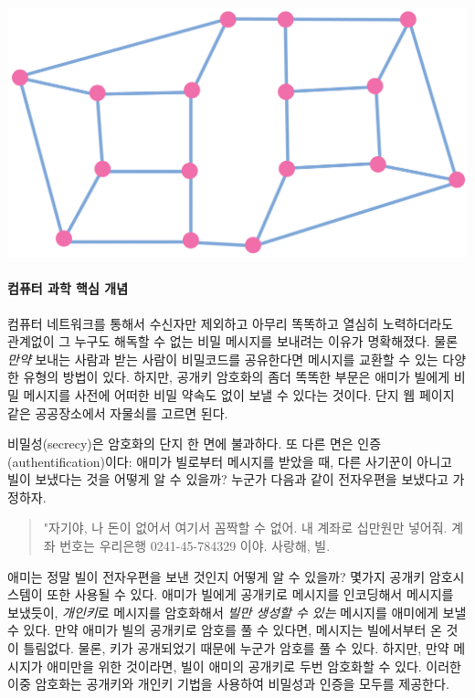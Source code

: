 \documentclass[]{article}
\begin{document}
\includegraphics{csunplugged/05-part/img/ch19-public-key/18-public-key-05-encoding.png}

\mbox{}\paragraph{컴퓨터 과학 핵심 개념}\label{section-253}

컴퓨터 네트워크를 통해서 수신자만 제외하고 아무리 똑똑하고 열심히
노력하더라도 관계없이 그 누구도 해독할 수 없는 비밀 메시지를 보내려는
이유가 명확해졌다. 물론 \emph{만약} 보내는 사람과 받는 사람이 비밀코드를
공유한다면 메시지를 교환할 수 있는 다양한 유형의 방법이 있다. 하지만,
공개키 암호화의 좀더 똑똑한 부문은 애미가 빌에게 비밀 메시지를 사전에
어떠한 비밀 약속도 없이 보낼 수 있다는 것이다. 단지 웹 페이지 같은
공공장소에서 자물쇠를 고르면 된다.

비밀성(secrecy)은 암호화의 단지 한 면에 불과하다. 또 다른 면은
인증(authentification)이다: 애미가 빌로부터 메시지를 받았을 때, 다른
사기꾼이 아니고 빌이 보냈다는 것을 어떻게 알 수 있을까? 누군가 다음과
같이 전자우편을 보냈다고 가정하자.

\begin{quote}
"자기야, 나 돈이 없어서 여기서 꼼짝할 수 없어. 내 계좌로 십만원만
넣어줘. 계좌 번호는 우리은행 0241-45-784329 이야. 사랑해, 빌.
\end{quote}

애미는 정말 빌이 전자우편을 보낸 것인지 어떻게 알 수 있을까? 몇가지
공개키 암호시스템이 또한 사용될 수 있다. 애미가 빌에게 공개키로 메시지를
인코딩해서 메시지를 보냈듯이, \emph{개인키}로 메시지를 암호화해서
\emph{빌만 생성할 수 있는} 메시지를 애미에게 보낼 수 있다. 만약 애미가
빌의 공개키로 암호를 풀 수 있다면, 메시지는 빌에서부터 온 것이 틀림없다.
물론, 키가 공개되었기 때문에 누군가 암호를 풀 수 있다. 하지만, 만약
메시지가 애미만을 위한 것이라면, 빌이 애미의 공개키로 두번 암호화할 수
있다. 이러한 이중 암호화는 공개키와 개인키 기법을 사용하여 비밀성과
인증을 모두를 제공한다.
\end{document}

